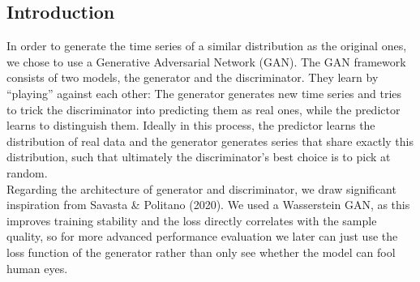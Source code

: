 \documentclass{article}
\begin{document}
\begin{multicols}{2}
    \section{Introduction}
    In order to generate the time series of a similar distribution as the original ones, we chose to use a Generative Adversarial Network (GAN). The GAN framework consists of two models, the generator and the discriminator. They learn by “playing” against each other: The generator generates new time series and tries to trick the discriminator into predicting them as real ones, while the predictor learns to distinguish them. Ideally in this process, the predictor learns the distribution of real data and the generator generates series that share exactly this distribution, such that ultimately the discriminator's best choice is to pick at random. \\
    Regarding the architecture of generator and discriminator, we draw significant inspiration from Savasta \& Politano (2020). We used a Wasserstein GAN, as this improves training stability and the loss directly correlates with the sample quality, so for more advanced performance evaluation we later can just use the loss function of the generator rather than only see whether the model can fool human eyes.

\end{multicols}
\end{document}
